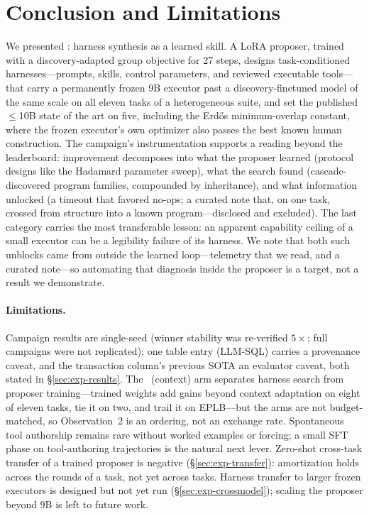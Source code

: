\section{Conclusion and Limitations}
\label{sec:conclusion}

We presented \method{}: harness synthesis as a learned skill.  A LoRA
proposer, trained with a discovery-adapted group objective for 27 steps,
designs task-conditioned harnesses---prompts, skills, control parameters,
and reviewed executable tools---that carry a permanently frozen 9B executor
past a discovery-finetuned model of the same scale on all eleven tasks of a
heterogeneous suite, and set the published $\le$10B state of the art on
five, including the Erd\H{o}s minimum-overlap constant, where the frozen
executor's own optimizer also passes the best known human construction.  The campaign's instrumentation supports a reading beyond the
leaderboard: improvement decomposes into what the proposer learned (protocol
designs like the Hadamard parameter sweep), what the search found
(cascade-discovered program families, compounded by inheritance), and what
information unlocked (a timeout that favored no-ops; a curated note that, on
one task, crossed from structure into a known program---disclosed and
excluded).  The last category carries the most transferable lesson: an apparent capability
ceiling of a small executor can be a legibility failure of its harness.  We note
that both such unblocks came from outside the learned loop---telemetry that we
read, and a curated note---so automating that diagnosis inside the proposer is a
target, not a result we demonstrate.

\paragraph{Limitations.}  Campaign results are single-seed (winner
stability was re-verified $5\times$; full campaigns were not replicated); one
table entry (LLM-SQL) carries a provenance caveat, and the transaction
column's previous SOTA an evaluator caveat, both stated in
\S\ref{sec:exp-results}.  The \method~(context) arm separates harness search
from proposer training---trained weights add gains beyond context adaptation
on eight of eleven tasks, tie it on two, and trail it on EPLB---but the arms
are not budget-matched, so Observation~2 is an ordering, not an exchange
rate.  Spontaneous tool authorship remains rare
without worked examples or forcing; a small SFT phase on tool-authoring
trajectories is the natural next lever.
Zero-shot cross-task transfer of a trained proposer is negative
(\S\ref{sec:exp-transfer}): amortization holds across the rounds of a task,
not yet across tasks.  Harness transfer to larger frozen executors is
designed but not yet run (\S\ref{sec:exp-crossmodel}); scaling the proposer
beyond 9B is left to future work.

